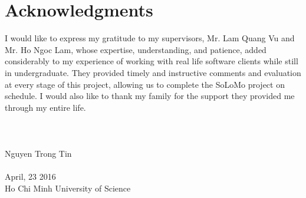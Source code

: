 \cleardoublepage
{}
{}
\chapter*{Acknowledgments}
\vspace{1.0in}
I would like to express my gratitude to my supervisors, Mr. Lam Quang Vu
and Mr. Ho Ngoc Lam, whose expertise, understanding, and patience,
added considerably to my experience of working with real life software clients while still in undergraduate. They provided timely and
instructive comments and evaluation at every stage of this project,
allowing us to complete the SoLoMo project on schedule.
I would also like to thank my family for the support they provided me
through my entire life.
\\
\\
\\ 
\\
Nguyen Trong Tin\\ 
\\
April, 23 2016\\
{Ho Chi Minh University of Science}\\
\newpage

